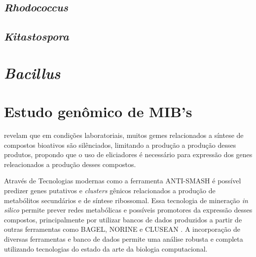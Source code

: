 \subsection{\textit{Rhodococcus}}
\subsection{\textit{Kitastospora}}
\section{\textit{Bacillus}}

\section{Estudo genômico de MIB's}

\citeonline revelam que em condições laboratoriais, muitos gemes relacionados a síntese de
compostos bioativos são silênciados, limitando a produção a produção desses produtos, propondo
que o uso de eliciadores é necessário para expressão dos genes releacionados a produção desses 
compostos.

Através de Tecnologias modernas como a ferramenta ANTI-SMASH \cite{antismash} é possível predizer
genes putativos e \textit{clusters} gênicos relacionados a produção de metabólitos secundários
e de síntese ribossomal. Essa tecnologia de mineração \textit{in silico} permite prever redes
metabólicas e possíveis promotores da expressão desses compostos, principalmente por utilizar
bancos de dados produzidos a partir de outras ferramentas como BAGEL\cite{bagel2,bagel3},
NORINE \cite{norine} e CLUSEAN \cite{clusean}. A incorporação de diversas ferramentas e banco de dados
permite uma análise robusta e completa utilizando tecnologias do estado da arte da biologia computacional.

